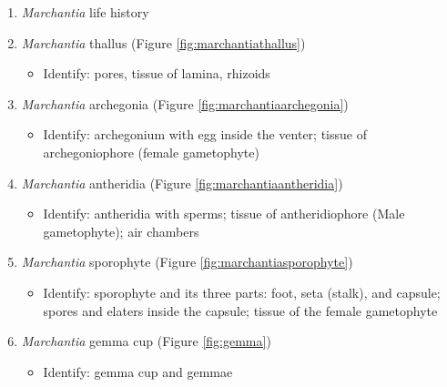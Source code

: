 \documentclass[]{book}
\providecommand{\tightlist}{%
  \setlength{\itemsep}{0pt}\setlength{\parskip}{0pt}}
\theoremstyle{definition}
\theoremstyle{definition}
\theoremstyle{definition}
\theoremstyle{remark}
\begin{document}
\begin{enumerate}
\def\labelenumi{\arabic{enumi}.}
\tightlist
\item
  \emph{Marchantia} life history
\item
  \emph{Marchantia} thallus (Figure \ref{fig:marchantiathallus})

  \begin{itemize}
  \tightlist
  \item
    Identify: pores, tissue of lamina, rhizoids
  \end{itemize}
\item
  \emph{Marchantia} archegonia (Figure \ref{fig:marchantiaarchegonia})

  \begin{itemize}
  \tightlist
  \item
    Identify: archegonium with egg inside the venter; tissue of
    archegoniophore (female gametophyte)
  \end{itemize}
\item
  \emph{Marchantia} antheridia (Figure \ref{fig:marchantiaantheridia})

  \begin{itemize}
  \tightlist
  \item
    Identify: antheridia with sperms; tissue of antheridiophore (Male
    gametophyte); air chambers
  \end{itemize}
\item
  \emph{Marchantia} sporophyte (Figure \ref{fig:marchantiasporophyte})

  \begin{itemize}
  \tightlist
  \item
    Identify: sporophyte and its three parts: foot, seta (stalk), and
    capsule; spores and elaters inside the capsule; tissue of the female
    gametophyte
  \end{itemize}
\item
  \emph{Marchantia} gemma cup (Figure \ref{fig:gemma})

  \begin{itemize}
  \tightlist
  \item
    Identify: gemma cup and gemmae
  \end{itemize}
\end{enumerate}
\end{document}
